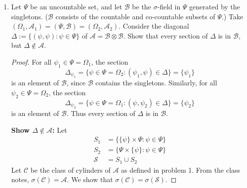\documentclass[letterpaper, 12pt]{article}
\newcommand{\cA}{\mathcal{A}}
\newcommand{\cB}{\mathcal{B}}
\newcommand{\cC}{\mathcal{C}}
\newcommand{\cS}{\mathcal{S}}
\begin{document}
\begin{enumerate}
\begin{proof}
For the first part, notice
\begin{align*}
A_{\omega_1} 
&= \{\omega_2 \in \Omega_2 : (\omega_1, \omega_2) \in A \} \\
&= \{\omega_2 \in \Omega_2 : i_{\omega_1}(\omega_2) \in A\} \\
&= (i_{\omega_1})^{-1}(A) \\
&= i_{\omega_1}^{-1}(A)
\end{align*}
as desired. 
Also, for all $\omega_2 \in \Omega_2$ it is the case that 
\[
X_{\omega_1}(\omega_2) = X(\omega_1, \omega_2) = X(i_{\omega_1}(\omega_2)) = X \circ i_{\omega_1} (\omega_2)
\text{.}
\]
Hence $X_{\omega_1} = X \circ i_{\omega_1}$ as desired.
\end{proof}
\item
Let $\Psi$ be an uncountable set, and let $\cB$ be the $\sigma$-field in $\Psi$ generated by the singletons. 
($\cB$ consists of the countable and co-countable subsets of $\Psi$.) 
Take $(\Omega_1,\cA_1) = (\Psi,\cB) = (\Omega_2,\cA_2)$. 
Consider the diagonal $\Delta:=\{ (\psi,\psi):\psi\in\Psi \}$ of $\cA = \cB\otimes\cB$. 
Show that every section of $\Delta$ is in $\cB$, but $\Delta\notin\cA$.

\begin{proof}
For all $\psi_1 \in \Psi = \Omega_1$, the section 
\[
\Delta_{\psi_1} = \{\psi \in \Psi = \Omega_2 : (\psi_1, \psi) \in \Delta\} = \{\psi_1\}
\]
is an element of $\cB$, since $\cB$ contains the singletons.
Similarly, for all $\psi_2 \in \Psi = \Omega_2$, the section
\[
\Delta_{\psi_2}
= \{\psi \in \Psi = \Omega_1 : (\psi, \psi_2) \in \Delta\} = \{\psi_2\}
\]
is an element of $\cB$. Thus every section of $\Delta$ is in $\cB$.

\textbf{Show $\Delta \notin \cA$:}
Let
\begin{align*}
S_1
&=
\{ \{\psi\} \times \Psi : \psi \in \Psi\}
\\
S_2
&=
\{ \Psi \times \{\psi\} : \psi \in \Psi\}
\\
\cS
&=
S_1 \cup S_2
\end{align*}
Let $\cC$ be the class of cylinders of $\cA$ as defined in problem 1. From the class notes, $\sigma(\cC) = \cA$. We show that $\sigma(\cC) = \sigma(\cS)$.


\end{proof}
\end{enumerate}
\end{document}
